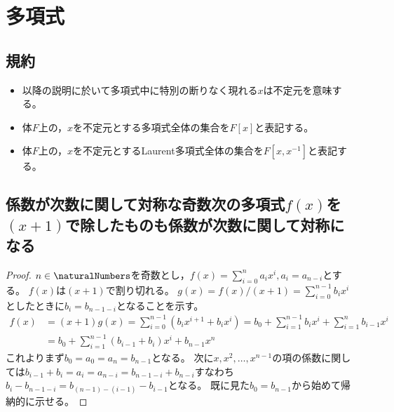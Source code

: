 \chapter{多項式}
    \section{規約}
        \begin{itemize}
            \item 以降の説明に於いて多項式中に特別の断りなく現れる$x$は不定元を意味する。
            \item 体$F$上の，$x$を不定元とする多項式全体の集合を$F[x]$と表記する。
            \item 体$F$上の，$x$を不定元とするLaurent多項式全体の集合を$F[x,x^{-1}]$と表記する。
        \end{itemize}
    \section{係数が次数に関して対称な奇数次の多項式\texorpdfstring{$f(x)$}{f(x)}を\texorpdfstring{$(x+1)$}{x+1}で除したものも係数が次数に関して対称になる}
        \begin{proof}
            $n\in\naturalNumbers$を奇数とし，$f(x) = \sum_{i=0}^n a_ix^i,a_i = a_{n-i}$とする。
            $f(x)$は$(x+1)$で割り切れる。
            $g(x) = f(x)/(x+1) = \sum_{i=0}^{n-1} b_ix^i$としたときに$b_i = b_{n-1-i}$となることを示す。
            \begin{align*}
                f(x) &= (x+1)g(x) = \sum_{i=0}^{n-1} (b_ix^{i+1} + b_ix^i) = b_0 + \sum_{i=1}^{n-1}b_ix^i + \sum_{i=1}^n b_{i-1}x^i \\
                &= b_0 + \sum_{i=1}^{n-1} (b_{i-1} + b_i)x^i + b_{n-1}x^n
            \end{align*}
            これよりまず$b_0 = a_0 = a_n = b_{n-1}$となる。
            次に$x,x^2,\dotsc,x^{n-1}$の項の係数に関しては$b_{i-1} + b_i = a_i = a_{n-i} = b_{n-1-i} + b_{n-i}$すなわち$b_i - b_{n-1-i} = b_{(n-1)-(i-1)} - b_{i-1}$となる。
            既に見た$b_0 = b_{n-1}$から始めて帰納的に示せる。
        \end{proof}
